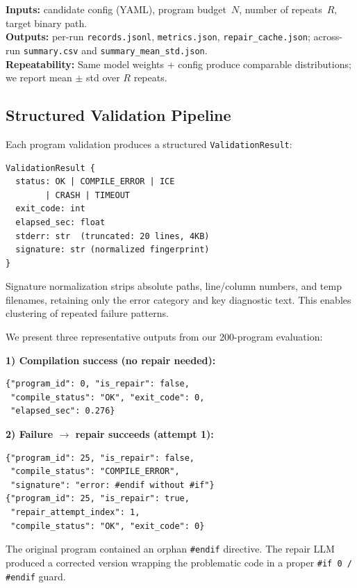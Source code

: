 \documentclass[conference]{IEEEtran}
\begin{document}
\noindent\textbf{Inputs:} candidate config (YAML), program budget~$N$, number of repeats~$R$, target binary path.\\
\textbf{Outputs:} per-run \texttt{records.jsonl}, \texttt{metrics.json}, \texttt{repair\_cache.json}; across-run \texttt{summary.csv} and \texttt{summary\_mean\_std.json}.\\
\textbf{Repeatability:} Same model weights + config produce comparable distributions; we report mean $\pm$ std over $R$ repeats.

\subsection{Structured Validation Pipeline}

Each program validation produces a structured \texttt{ValidationResult}:

\begin{lstlisting}
ValidationResult {
  status: OK | COMPILE_ERROR | ICE
        | CRASH | TIMEOUT
  exit_code: int
  elapsed_sec: float
  stderr: str  (truncated: 20 lines, 4KB)
  signature: str (normalized fingerprint)
}
\end{lstlisting}

\noindent Signature normalization strips absolute paths, line/column numbers, and temp filenames, retaining only the error category and key diagnostic text. This enables clustering of repeated failure patterns.

We present three representative outputs from our 200-program evaluation:

\textbf{1) Compilation success (no repair needed):}
\begin{lstlisting}
{"program_id": 0, "is_repair": false,
 "compile_status": "OK", "exit_code": 0,
 "elapsed_sec": 0.276}
\end{lstlisting}

\textbf{2) Failure $\to$ repair succeeds (attempt 1):}
\begin{lstlisting}
{"program_id": 25, "is_repair": false,
 "compile_status": "COMPILE_ERROR",
 "signature": "error: #endif without #if"}
{"program_id": 25, "is_repair": true,
 "repair_attempt_index": 1,
 "compile_status": "OK", "exit_code": 0}
\end{lstlisting}

The original program contained an orphan \texttt{\#endif} directive. The repair LLM produced a corrected version wrapping the problematic code in a proper \texttt{\#if 0 / \#endif} guard.
\end{document}

